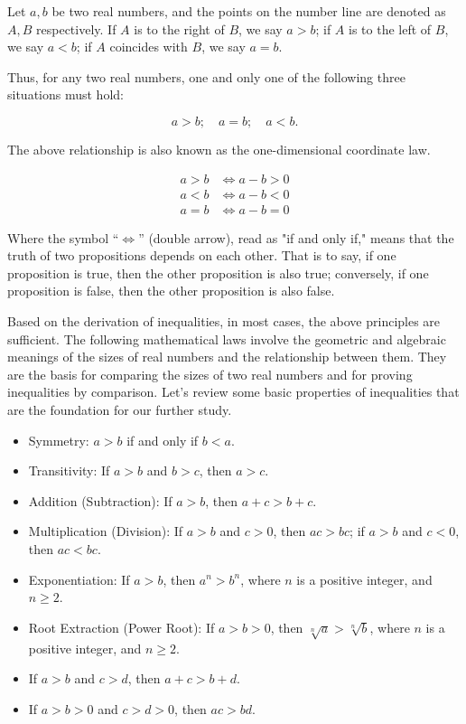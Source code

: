 \documentclass[
	12pt, %
	fleqn, %
	a4paper, %
]{LegrandOrangeBook}
\begin{document}
Let \( a, b \) be two real numbers, and the points on the number line are denoted as \( A, B \) respectively. If \( A \) is to the right of \( B \), we say \( a > b \); if \( A \) is to the left of \( B \), we say \( a < b \); if \( A \) coincides with \( B \), we say \( a = b \).

Thus, for any two real numbers, one and only one of the following three situations must hold:

\[
a > b; \quad a = b; \quad a < b.
\]

The above relationship is also known as the one-dimensional coordinate law.

\[
\begin{aligned}
a > b &\Leftrightarrow a - b > 0 \\
a < b &\Leftrightarrow a - b < 0 \\
a = b &\Leftrightarrow a - b = 0
\end{aligned}
\]

Where the symbol “\( \Leftrightarrow \)” (double arrow), read as "if and only if," means that the truth of two propositions depends on each other. That is to say, if one proposition is true, then the other proposition is also true; conversely, if one proposition is false, then the other proposition is also false.

Based on the derivation of inequalities, in most cases, the above principles are sufficient. The following mathematical laws involve the geometric and algebraic meanings of the sizes of real numbers and the relationship between them. They are the basis for comparing the sizes of two real numbers and for proving inequalities by comparison. Let's review some basic properties of inequalities that are the foundation for our further study.

\begin{itemize}
    \item Symmetry: \( a > b \) if and only if \( b < a \).
    \item Transitivity: If \( a > b \) and \( b > c \), then \( a > c \).
    \item Addition (Subtraction): If \( a > b \), then \( a + c > b + c \).
    \item Multiplication (Division): If \( a > b \) and \( c > 0 \), then \( ac > bc \); if \( a > b \) and \( c < 0 \), then \( ac < bc \).
    \item Exponentiation: If \( a > b \), then \( a^n > b^n \), where \( n \) is a positive integer, and \( n \geq 2 \).
    \item Root Extraction (Power Root): If \( a > b > 0 \), then \( \sqrt[n]{a} > \sqrt[n]{b} \), where \( n \) is a positive integer, and \( n \geq 2 \).
    \item If \( a > b \) and \( c > d \), then \( a + c > b + d \).
    \item If \( a > b > 0 \) and \( c > d > 0 \), then \( ac > bd \).
\end{itemize}
\end{document}
